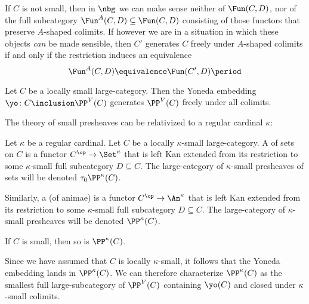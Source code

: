 \begin{remark}
	If $ C $ is not small, then in $ \nbg $
	we can make sense neither of $ \Fun(C,D) $,
	nor of the full subcategory
	$ \Fun^{A}(C, D) \subseteq \Fun(C,D) $
	consisting of those functors that preserve
	$ A $-shaped colimits.
	If however we are in a situation in which
	these objects \emph{can} be made sensible,
	then $ C' $ generates $ C $ freely under
	$ A $-shaped colimits
	if and only if the restriction induces an equivalence
	\[ \Fun^A(C, D) \equivalence \Fun(C', D) \period \]
\end{remark}

\begin{proposition}%
	\label{prp:PPsmisfreelygenerated}
	Let $ C $ be a locally small large-category.
	Then the Yoneda embedding
	$ \yo \colon C \inclusion \PP^V(C) $
	generates $ \PP^V(C) $ freely under all colimits.
\end{proposition}

The theory of small presheaves can be relativized
to a regular cardinal $ \kappa $:

\begin{definition}
	Let $ \kappa $ be a regular cardinal.
	Let $ C $ be a locally $ \kappa $-small large-category.
	A  of sets on $ C $
	is a functor $ C^{\op} \to \Set^{\kappa} $
	that is left Kan extended from its restriction to
	some $ \kappa $-small full subcategory $ D \subseteq C $.
	The large-category of $ \kappa $-small presheaves of sets
	will be denoted $ \tau_0\PP^{\kappa}(C) $.

	Similarly, a 
	(of animae) is a functor $ C^{\op} \to \An^{\kappa} $
	that is left Kan extended from its restriction to 
	some $ \kappa $-small full subcategory $ D \subseteq C $.
	The large-category of $ \kappa $-small presheaves
	will be denoted $ \PP^{\kappa}(C) $.
\end{definition}

\begin{nul}
	If $ C $ is small, then so is $ \PP^{\kappa}(C) $.
\end{nul}

\begin{nul}
	Since we have assumed that $ C $ is locally $ \kappa $-small,
	it follows that the Yoneda embedding lands in $ \PP^{\kappa}(C) $.
	We can therefore characterize $ \PP^{\kappa}(C) $
	as the smallest full large-subcategory of $ \PP^V(C) $
	containing $ \yo(C) $ and closed under $ \kappa $-small colimits.
\end{nul}

